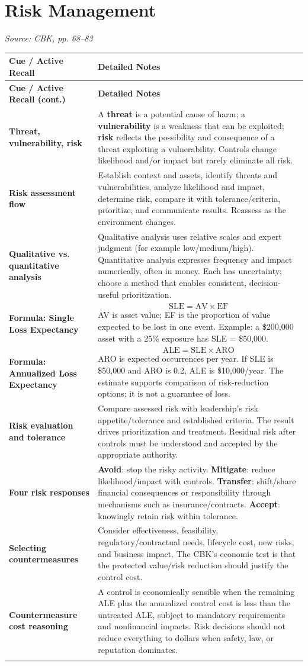 \documentclass[10pt,letterpaper]{article}
\makeatletter
\newenvironment{cornell}
{\rowcolors{2}{white}{notebg}\begin{longtable}{@{}>{\raggedright\arraybackslash\columncolor{cuebg}\color{navy}\bfseries}p{0.285\textwidth}>{\raggedright\arraybackslash}p{0.65\textwidth}@{}}
\rowcolor{navy}\color{white}\textbf{Cue / Active Recall} & \color{white}\textbf{Detailed Notes}\\ \hline
\endfirsthead
\rowcolor{navy}\color{white}\textbf{Cue / Active Recall (cont.)} & \color{white}\textbf{Detailed Notes}\\ \hline
\endhead}
{\end{longtable}}
\newcommand{\noterow}[2]{#1 & #2\\\arrayrulecolor{line}\hline}
\newcommand{\source}[1]{\par{\footnotesize\color{teal}\textit{Source: CBK, #1}}\par}
\makeatother
\begin{document}
\section{\color{navy}Risk Management}
\source{pp. 68--83}
\begin{cornell}
\noterow{Threat, vulnerability, risk}{A \textbf{threat} is a potential cause of harm; a \textbf{vulnerability} is a weakness that can be exploited; \textbf{risk} reflects the possibility and consequence of a threat exploiting a vulnerability. Controls change likelihood and/or impact but rarely eliminate all risk.}
\noterow{Risk assessment flow}{Establish context and assets, identify threats and vulnerabilities, analyze likelihood and impact, determine risk, compare it with tolerance/criteria, prioritize, and communicate results. Reassess as the environment changes.}
\noterow{Qualitative vs. quantitative analysis}{Qualitative analysis uses relative scales and expert judgment (for example low/medium/high). Quantitative analysis expresses frequency and impact numerically, often in money. Each has uncertainty; choose a method that enables consistent, decision-useful prioritization.}
\noterow{Formula: Single Loss Expectancy}{\[
\mathrm{SLE}=\mathrm{AV}\times\mathrm{EF}
\]
AV is asset value; EF is the proportion of value expected to be lost in one event. Example: a \$200,000 asset with a 25\% exposure has SLE = \$50,000.}
\noterow{Formula: Annualized Loss Expectancy}{\[
\mathrm{ALE}=\mathrm{SLE}\times\mathrm{ARO}
\]
ARO is expected occurrences per year. If SLE is \$50,000 and ARO is 0.2, ALE is \$10,000/year. The estimate supports comparison of risk-reduction options; it is not a guarantee of loss.}
\noterow{Risk evaluation and tolerance}{Compare assessed risk with leadership's risk appetite/tolerance and established criteria. The result drives prioritization and treatment. Residual risk after controls must be understood and accepted by the appropriate authority.}
\noterow{Four risk responses}{\textbf{Avoid}: stop the risky activity. \textbf{Mitigate}: reduce likelihood/impact with controls. \textbf{Transfer}: shift/share financial consequences or responsibility through mechanisms such as insurance/contracts. \textbf{Accept}: knowingly retain risk within tolerance.}
\noterow{Selecting countermeasures}{Consider effectiveness, feasibility, regulatory/contractual needs, lifecycle cost, new risks, and business impact. The CBK's economic test is that the protected value/risk reduction should justify the control cost.}
\noterow{Countermeasure cost reasoning}{A control is economically sensible when the remaining ALE plus the annualized control cost is less than the untreated ALE, subject to mandatory requirements and nonfinancial impacts. Risk decisions should not reduce everything to dollars when safety, law, or reputation dominates.}

\end{cornell}
\end{document}
